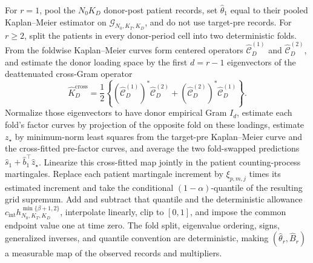 For \(r=1\), pool the \(N_0K_D\) donor-post patient records, set \(\widehat\theta_1\) equal to their pooled Kaplan--Meier estimator on \(\mathcal G_{N_0,K_T,K_D}\), and do not use target-pre records.  For \(r\ge2\), split the patients in every donor-period cell into two deterministic folds.  From the foldwise Kaplan--Meier curves form centered operators \(\widehat{\mathcal C}_D^{(1)}\) and \(\widehat{\mathcal C}_D^{(2)}\), and estimate the donor loading space by the first \(d=r-1\) eigenvectors of the deattenuated cross-Gram operator
\[
 \widehat K_D^{\mathrm{cross}}
 =\frac12\left\{(\widehat{\mathcal C}_D^{(1)})^*\widehat{\mathcal C}_D^{(2)}
 +(\widehat{\mathcal C}_D^{(2)})^*\widehat{\mathcal C}_D^{(1)}\right\}.
\]
Normalize those eigenvectors to have donor empirical Gram \(I_d\), estimate each fold's factor curves by projection of the opposite fold on these loadings, estimate \(z_\star\) by minimum-norm least squares from the target-pre Kaplan--Meier curve and the cross-fitted pre-factor curves, and average the two fold-swapped predictions \(\widehat s_1+\widehat b_1^\top\widehat z_\star\).  Linearize this cross-fitted map jointly in the patient counting-process martingales.  Replace each patient martingale increment by \(\xi_{p,m,j}\) times its estimated increment and take the conditional \((1-\alpha)\)-quantile of the resulting grid supremum.  Add and subtract that quantile and the deterministic allowance \(c_{\mathrm{int}}h_{N_0,K_T,K_D}^{\min\{\beta+1,2\}}\), interpolate linearly, clip to \([0,1]\), and impose the common endpoint value one at time zero.  The fold split, eigenvalue ordering, signs, generalized inverses, and quantile convention are deterministic, making \((\widehat\theta_r,\widehat B_r)\) a measurable map of the observed records and multipliers.
